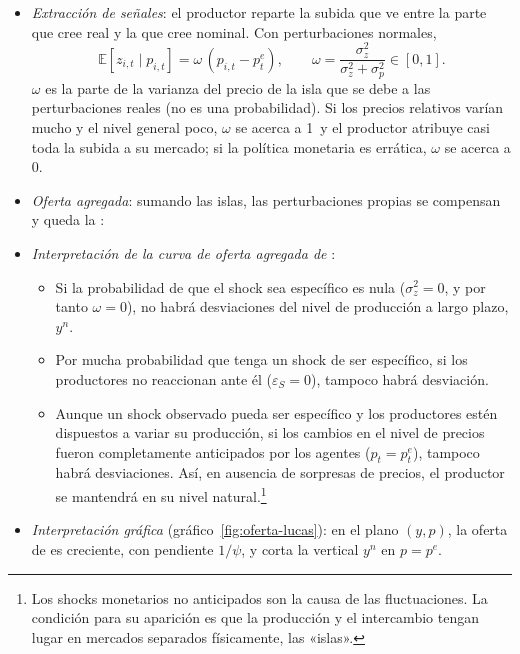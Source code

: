 \documentclass[11pt]{article}
\begin{document}
\begin{itemize}
\item \emph{Extracción de señales}: el productor reparte la subida que ve entre la parte que cree real y la que cree nominal. Con perturbaciones normales,
  \begin{equation}\label{eq:extraccion}
  \mathbb{E}[z_{i,t}\mid p_{i,t}]=\omega\,\left(p_{i,t}-p^e_t\right),\qquad \omega=\frac{\sigma^2_z}{\sigma^2_z+\sigma^2_p}\in[0,1].
  \end{equation}
  $\omega$ es la parte de la varianza del precio de la isla que se debe a las perturbaciones reales (no es una probabilidad). Si los precios relativos varían mucho y el nivel general poco, $\omega$ se acerca a 1~y el productor atribuye casi toda la subida a su mercado; si la política monetaria es errática, $\omega$ se acerca a 0.
\item \emph{Oferta agregada}: sumando las islas, las perturbaciones propias se compensan y queda la :
\item \emph{Interpretación de la curva de oferta agregada de }:
  \begin{itemize}
  \item Si la probabilidad de que el shock sea específico es nula ($\sigma^2_z=0$, y por tanto $\omega=0$), no habrá desviaciones del nivel de producción a largo plazo, $y^n$.
  \item Por mucha probabilidad que tenga un shock de ser específico, si los productores no reaccionan ante él ($\varepsilon_S=0$), tampoco habrá desviación.
  \item Aunque un shock observado pueda ser específico y los productores estén dispuestos a variar su producción, si los cambios en el nivel de precios fueron completamente anticipados por los agentes ($p_t=p^e_t$), tampoco habrá desviaciones. Así, en ausencia de sorpresas de precios, el productor se mantendrá en su nivel natural.\footnote{Los shocks monetarios no anticipados son la causa de las fluctuaciones. La condición para su aparición es que la producción y el intercambio tengan lugar en mercados separados físicamente, las «islas».}
  \end{itemize}
\item \emph{Interpretación gráfica} (gráfico~\ref{fig:oferta-lucas}): en el plano $(y,p)$, la oferta de  es creciente, con pendiente $1/\psi$, y corta la vertical $y^n$ en $p=p^e$.
\end{itemize}
\end{document}
